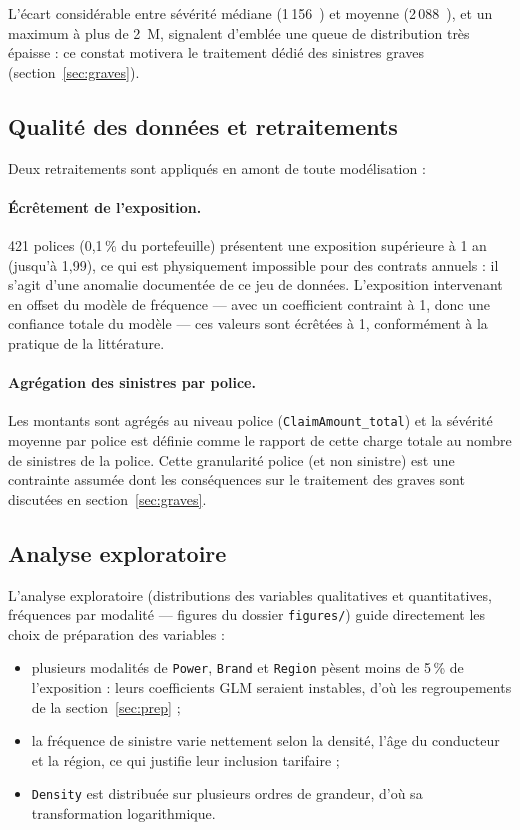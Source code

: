 \documentclass[11pt,a4paper]{article}
\newcommand{\eur}{\texteuro}
\begin{document}
L'écart considérable entre sévérité médiane (1\,156~\eur) et moyenne (2\,088~\eur), et un maximum à plus de 2~M\eur, signalent d'emblée une queue de distribution très épaisse : ce constat motivera le traitement dédié des sinistres graves (section~\ref{sec:graves}).

\subsection{Qualité des données et retraitements}

Deux retraitements sont appliqués en amont de toute modélisation :

\paragraph{Écrêtement de l'exposition.} 421 polices (0{,}1\,\% du portefeuille) présentent une exposition supérieure à 1 an (jusqu'à 1{,}99), ce qui est physiquement impossible pour des contrats annuels : il s'agit d'une anomalie documentée de ce jeu de données. L'exposition intervenant en offset du modèle de fréquence --- avec un coefficient contraint à 1, donc une confiance totale du modèle --- ces valeurs sont écrêtées à 1, conformément à la pratique de la littérature.

\paragraph{Agrégation des sinistres par police.} Les montants sont agrégés au niveau police (\texttt{ClaimAmount\_total}) et la sévérité moyenne par police est définie comme le rapport de cette charge totale au nombre de sinistres de la police. Cette granularité police (et non sinistre) est une contrainte assumée dont les conséquences sur le traitement des graves sont discutées en section~\ref{sec:graves}.

\subsection{Analyse exploratoire}

L'analyse exploratoire (distributions des variables qualitatives et quantitatives, fréquences par modalité --- figures du dossier \texttt{figures/}) guide directement les choix de préparation des variables :

\begin{itemize}
    \item plusieurs modalités de \texttt{Power}, \texttt{Brand} et \texttt{Region} pèsent moins de 5\,\% de l'exposition : leurs coefficients GLM seraient instables, d'où les regroupements de la section~\ref{sec:prep} ;
    \item la fréquence de sinistre varie nettement selon la densité, l'âge du conducteur et la région, ce qui justifie leur inclusion tarifaire ;
    \item \texttt{Density} est distribuée sur plusieurs ordres de grandeur, d'où sa transformation logarithmique.
\end{itemize}
\end{document}
